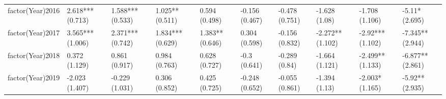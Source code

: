 \begin{table}[ht]
\begin{tabular}{llllllllll}
  factor(Year)2016 & 2.618*** (0.713) & 1.588*** (0.533) & 1.025** (0.511) & 0.594 (0.498) & -0.156 (0.467) & -0.478 (0.751) & -1.628 (1.08) & -1.708 (1.106) & -5.11* (2.695) \\ 
  factor(Year)2017 & 3.565*** (1.006) & 2.371*** (0.742) & 1.834*** (0.629) & 1.383** (0.646) & 0.304 (0.598) & -0.156 (0.832) & -2.272** (1.102) & -2.92*** (1.102) & -7.345** (2.944) \\ 
  factor(Year)2018 & 0.372 (1.129) & 0.861 (0.917) & 0.984 (0.763) & 0.628 (0.727) & -0.3 (0.641) & -0.289 (0.84) & -1.664 (1.121) & -2.499** (1.133) & -6.877** (2.861) \\ 
  factor(Year)2019 & -2.023 (1.407) & -0.229 (1.031) & 0.306 (0.852) & 0.425 (0.725) & -0.248 (0.652) & -0.055 (0.861) & -1.394 (1.13) & -2.003* (1.165) & -5.92** (2.935) \\ 
   \bottomrule
\end{tabular}
\endgroup
\end{table}
